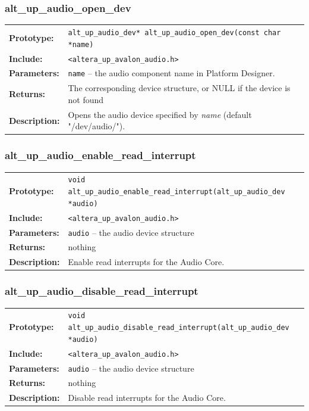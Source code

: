 \subsubsection{alt\_up\_audio\_open\_dev}
\begin{tabular}[ht]{lp{11cm}}
	\textbf{Prototype:}
	&
	\texttt{alt\_up\_audio\_dev* alt\_up\_audio\_open\_dev(const char *name)} 
	\\
	\textbf{Include:}
	&
	{\tt <altera\_up\_avalon\_audio.h>}
	\\
	{\textbf{Parameters:}}
	&
	\texttt{{name}}
	 -- the audio component name in Platform Designer. 
	\\
	\textbf{Returns:}
	& The corresponding device structure, or NULL if the device is not found
	\\
	\textbf{Description:}
	& Opens the audio device specified by {\it name} (default "/dev/audio/").\\
\end{tabular}
\vfill

\subsubsection{alt\_up\_audio\_enable\_read\_interrupt}
\begin{tabular}[ht]{lp{11cm}}
	\textbf{Prototype:}
	&
	\texttt{void alt\_up\_audio\_enable\_read\_interrupt(alt\_up\_audio\_dev *audio)} 
	\\
	\textbf{Include:}
	&
	{\tt <altera\_up\_avalon\_audio.h>}
	\\
	{\textbf{Parameters:}}
	&
	\texttt{{audio}}
	 -- the audio device structure 
	\\
	\textbf{Returns:}
	& nothing
	\\
	\textbf{Description:}
	& Enable read interrupts for the Audio Core.\\
\end{tabular}
\vfill

\subsubsection{alt\_up\_audio\_disable\_read\_interrupt}
\begin{tabular}[ht]{lp{11cm}}
	\textbf{Prototype:}
	&
	\texttt{void alt\_up\_audio\_disable\_read\_interrupt(alt\_up\_audio\_dev *audio)} 
	\\
	\textbf{Include:}
	&
	{\tt <altera\_up\_avalon\_audio.h>}
	\\
	{\textbf{Parameters:}}
	&
	\texttt{{audio}}
	 -- the audio device structure 
	\\
	\textbf{Returns:}
	& nothing
	\\
	\textbf{Description:}
	& Disable read interrupts for the Audio Core.\\
\end{tabular}
\vfill

